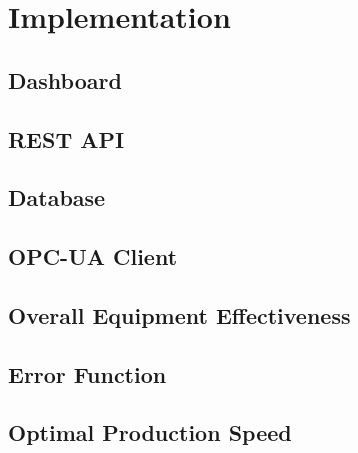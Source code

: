 \section{Implementation}
\subsection{Dashboard}
\subsection{REST API}
\subsection{Database}
\subsection{OPC-UA Client}
\subsection{Overall Equipment Effectiveness}
\subsection{Error Function}
\subsection{Optimal Production Speed}
